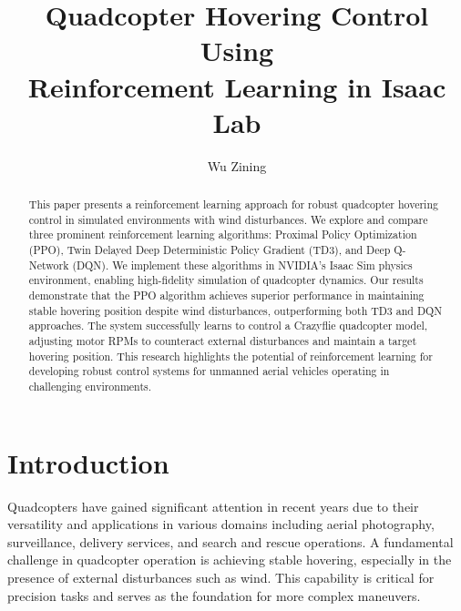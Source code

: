\documentclass[12pt]{article}
\title{Quadcopter Hovering Control Using\\Reinforcement Learning in Isaac Lab}
\author{Wu Zining}
\date{}
\begin{document}
\maketitle

\begin{abstract}
This paper presents a reinforcement learning approach for robust quadcopter hovering control in simulated environments with wind disturbances. We explore and compare three prominent reinforcement learning algorithms: Proximal Policy Optimization (PPO), Twin Delayed Deep Deterministic Policy Gradient (TD3), and Deep Q-Network (DQN). We implement these algorithms in NVIDIA's Isaac Sim physics environment, enabling high-fidelity simulation of quadcopter dynamics. Our results demonstrate that the PPO algorithm achieves superior performance in maintaining stable hovering position despite wind disturbances, outperforming both TD3 and DQN approaches. The system successfully learns to control a Crazyflie quadcopter model, adjusting motor RPMs to counteract external disturbances and maintain a target hovering position. This research highlights the potential of reinforcement learning for developing robust control systems for unmanned aerial vehicles operating in challenging environments.
\end{abstract}


\section{Introduction}
Quadcopters have gained significant attention in recent years due to their versatility and applications in various domains including aerial photography, surveillance, delivery services, and search and rescue operations. A fundamental challenge in quadcopter operation is achieving stable hovering, especially in the presence of external disturbances such as wind. This capability is critical for precision tasks and serves as the foundation for more complex maneuvers.
\end{document}
